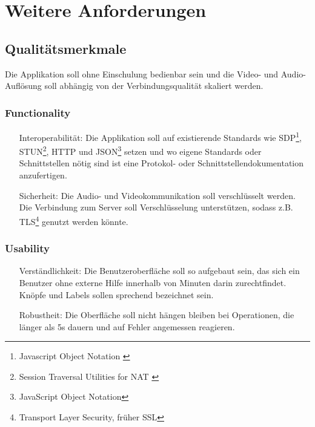 \section{Weitere Anforderungen}

	\subsection{Qualitätsmerkmale}
	Die Applikation soll ohne Einschulung bedienbar sein und die Video- und Audio-Auflösung
	soll abhängig von der Verbindungsqualität skaliert werden.


		\subsubsection{Functionality}
		\begin{itemize}
			\item[Interoperabilität:] Die Applikation soll auf existierende Standards wie 
			SDP\footnote{Javascript Object Notation \cite{IETF-JSON-RFC}}, 
			STUN\footnote{Session Traversal Utilities for NAT \cite{IETF-STUN-RFC}}, HTTP und JSON\footnote{JavaScript Object Notation\cite{IETF-JSON-RFC}} setzen und wo eigene Standards oder Schnittstellen nötig sind ist eine Protokol- oder Schnittstellendokumentation anzufertigen.
			\item[Sicherheit:] Die Audio- und Videokommunikation soll verschlüsselt werden. Die Verbindung zum Server soll Verschlüsselung unterstützen, sodass z.B. TLS\footnote{Transport Layer Security, früher SSL} genutzt werden könnte.
		\end{itemize}


		\subsubsection{Usability}
		\begin{itemize}
			\item[Verständlichkeit:] Die Benutzeroberfläche soll so aufgebaut sein, das sich ein Benutzer ohne externe Hilfe innerhalb von Minuten darin zurechtfindet. Knöpfe und Labels sollen sprechend bezeichnet sein.
			\item[Robustheit:] Die Oberfläche soll nicht hängen bleiben bei Operationen, die länger als 5s dauern und auf Fehler angemessen reagieren.
		\end{itemize}

